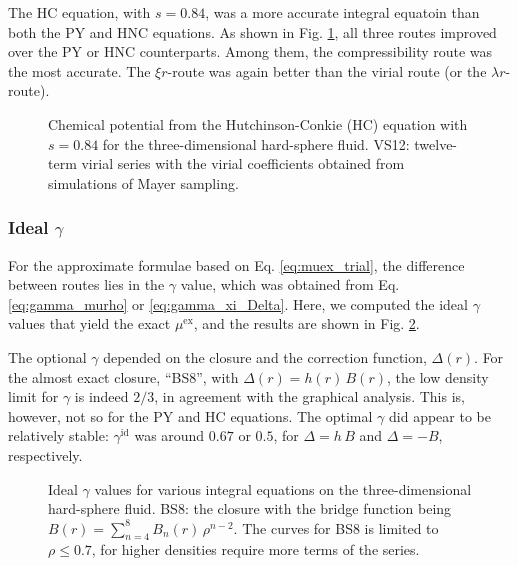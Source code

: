 \documentclass[aip,jcp,reprint,superscriptaddress]{revtex4-1}
\begin{document}
The HC equation, with $s = 0.84$,
was a more accurate integral equatoin than
both the PY and HNC equations.
%
As shown in Fig. \ref{fig:muhshc},
all three routes improved over
the PY or HNC counterparts.
%
Among them,
the compressibility route
was the most accurate.
%
The $\xi r$-route
was again better than the virial route
(or the $\lambda r$-route).
%





\begin{figure}[h]
  \caption{
    \label{fig:muhshc}
    Chemical potential from the Hutchinson-Conkie (HC) equation
    with $s = 0.84$
    for the three-dimensional hard-sphere fluid.
    VS12: twelve-term virial series
    with the virial coefficients obtained
    from simulations of Mayer sampling\cite{
    schultz2014}.
  }
\end{figure}




\subsubsection{Ideal $\gamma$}



For the approximate formulae
based on Eq. \eqref{eq:muex_trial},
the difference between routes
lies in the $\gamma$ value,
which was obtained from
Eq. \eqref{eq:gamma_murho}
or
\eqref{eq:gamma_xi_Delta}.
%
Here, we computed the ideal $\gamma$ values
that yield the exact $\mu^\mathrm{ex}$,
and the results are shown in Fig. \ref{fig:gamhs}.

The optional $\gamma$
depended on the closure
and the correction function, $\Delta(r)$.
%
For the almost exact closure, ``BS8'',
with $\Delta(r) = h(r) \, B(r)$,
the low density limit for $\gamma$
is indeed $2/3$,
in agreement with the graphical analysis.
%
This is, however, not so
for the PY and HC equations.
%
The optimal $\gamma$ did appear to be
relatively stable:
$\gamma^\mathrm{id}$ was around
$0.67$ or $0.5$,
for $\Delta = h \, B$
and $\Delta = -B$,
respectively.


\begin{figure}[h]
  \caption{
    \label{fig:gamhs}
    Ideal $\gamma$ values
    for various integral equations
    on the three-dimensional hard-sphere fluid.
    BS8: the closure with the bridge function being
    $B(r) = \sum_{n = 4}^8 B_n(r) \, \rho^{n-2}$.
    The curves for BS8 is limited to $\rho \le 0.7$,
    for higher densities require more terms
    of the series.
  }
\end{figure}
\end{document}
